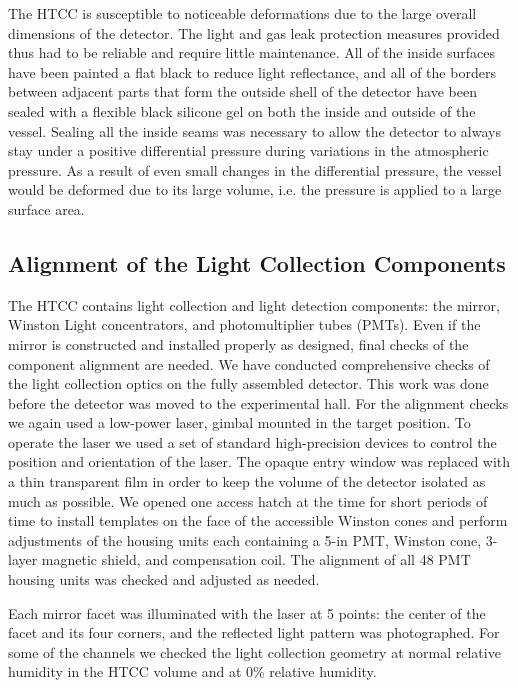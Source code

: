The HTCC is susceptible to noticeable deformations due to the large overall dimensions of the detector. The light
and gas leak protection measures provided thus had to be reliable and require little maintenance. All of the inside
surfaces have been painted a flat black to reduce light reflectance, and all of the borders between adjacent parts
that form the outside shell of the detector have been sealed with a flexible black silicone gel on both the inside and
outside of the vessel. Sealing all the inside seams was necessary to allow the detector to always stay under a positive
differential pressure during variations in the atmospheric pressure. As a result of even small changes in the
differential pressure, the vessel would be deformed due to its large volume, i.e. the pressure is applied to a large
surface area. 

\subsection{Alignment of the Light Collection Components}

The HTCC contains light collection and light detection components: the mirror, Winston Light concentrators, and
photomultiplier tubes (PMTs). Even if the mirror is constructed and installed properly as designed, final checks of
the component alignment are needed. We have conducted comprehensive checks of the light collection optics on the
fully assembled detector. This work was done before the detector was moved to the experimental hall. For the
alignment checks we again used a low-power laser, gimbal mounted in the target position. To operate the laser we
used a set of standard high-precision devices to control the position and orientation of the laser. The opaque entry
window was replaced with a thin transparent film in order to keep the volume of the detector isolated as much as
possible. We opened one access hatch at the time for short periods of time to install templates on the face of the
accessible Winston cones and perform adjustments of the housing units each containing a 5-in PMT, Winston cone,
3-layer magnetic shield, and compensation coil. The alignment of all 48 PMT housing units was checked and adjusted
as needed.

Each mirror facet was illuminated with the laser at 5 points: the center of the facet and its four corners, and the
reflected light  pattern was photographed. For some of the channels we checked the light collection geometry at
normal relative humidity in the HTCC volume and at 0\% relative humidity. 

